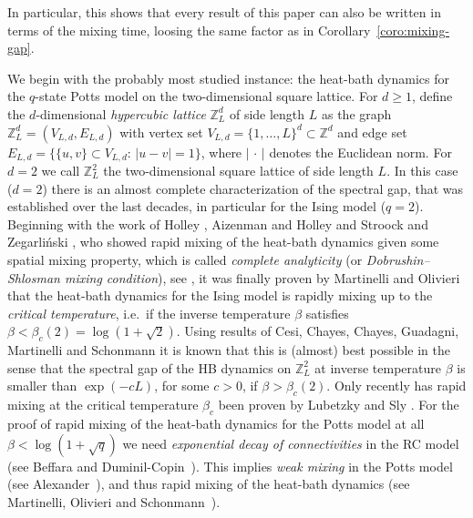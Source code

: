 \documentclass{dis}
\theoremstyle{citing}
\begin{document}
In particular, this shows that every result of this paper can 
also be written in terms of the mixing time, 
loosing the same factor as in Corollary~\ref{coro:mixing-gap}. 

We begin with the probably most studied instance: 
the heat-bath dynamics for the $q$-state Potts model 
on the two-dimensional square lattice.
For $d\ge1$, define the $d$-dimensional {\it hypercubic lattice} ${\ensuremath{\mathbb{Z}}}^d_L$ 
of side length $L$ as the graph ${\ensuremath{\mathbb{Z}}}^d_L=(V_{L,d},E_{L,d})$ with 
vertex set $V_{L,d}=\{1,\dots,L\}^d\subset{\ensuremath{\mathbb{Z}}}^d$ and 
edge set $E_{L,d}=\bigl\{\{u,v\}\subset V_{L,d}:\,{\left\vert {u-v} \right\vert}=1\bigr\}$, 
where ${\left\vert {\,\cdot\,} \right\vert}$ denotes the Euclidean norm. 
For $d=2$ we call ${\ensuremath{\mathbb{Z}}}_L^2$ the two-dimensional square lattice 
of side length $L$.
In this case ($d=2$) there is an almost complete characterization 
of the spectral gap, that was established over the last decades, 
in particular for the Ising model ($q=2$). 
Beginning with the work of Holley \cite{Holley}, 
Aizenman and Holley \cite{AizHol} and Stroock and Zegarli{\'n}ski 
\cite{SZ_lattice}, who showed rapid mixing of the heat-bath dynamics 
given some spatial mixing property, which is called 
\emph{complete analyticity} (or {\it Dobrushin--Shlosman mixing condition}), 
see \cite{DobrShlos_description}, it was finally proven by 
Martinelli and Olivieri \cite{MO1,MO2} that the heat-bath dynamics 
for the Ising model is rapidly mixing up to the \emph{critical 
temperature}, i.e.~if the inverse temperature $\beta$ 
satisfies $\beta<\beta_c(2)=\log(1+\sqrt{2})$.
Using results of Cesi, Chayes, Chayes, Guadagni, Martinelli and 
Schonmann \cite{CCS,CGMS,Schonmann} it is known that this is (almost) 
best possible in the sense that the spectral gap of the HB dynamics 
on ${\ensuremath{\mathbb{Z}}}_L^2$ at inverse temperature $\beta$ is smaller than 
$\exp(-c L)$, for some $c>0$, if $\beta>\beta_c(2)$.
Only recently has rapid mixing at the critical temperature $\beta_c$ 
been proven by Lubetzky and Sly \cite{LS}.
For the proof of rapid mixing of the heat-bath dynamics 
for the Potts model at all $\beta<\log(1+\sqrt{q})$ we need 
\emph{exponential decay of connectivities} in the RC model 
(see Beffara and Duminil-Copin~\cite{BDC}).  
This implies \emph{weak mixing} in the Potts model 
(see Alexander~\cite{A}), and thus 
rapid mixing of the heat-bath dynamics 
(see Martinelli, Olivieri and Schonmann~\cite{MOS}). 
\end{document}
